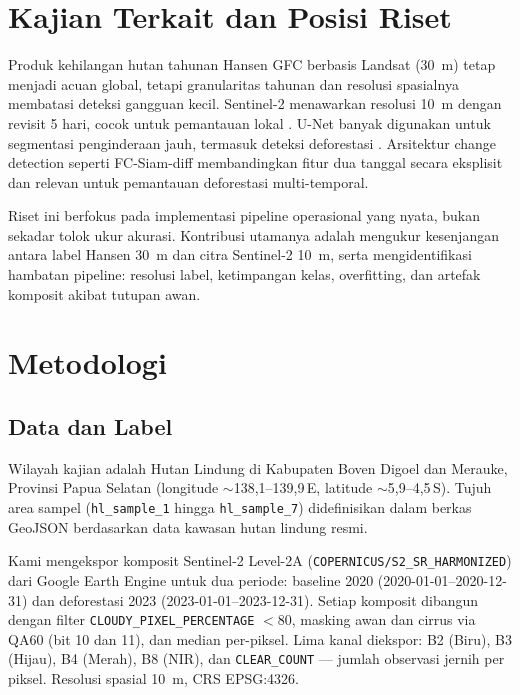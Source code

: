 \documentclass[10pt,a4paper,onecolumn]{article}
\begin{document}
\section{Kajian Terkait dan Posisi Riset}
Produk kehilangan hutan tahunan Hansen GFC \cite{hansen2013high} berbasis
Landsat (30~m) tetap menjadi acuan global, tetapi granularitas tahunan
dan resolusi spasialnya membatasi deteksi gangguan kecil. Sentinel-2
menawarkan resolusi 10~m dengan revisit 5 hari, cocok untuk pemantauan
lokal \cite{drusch2012sentinel2}. U-Net \cite{ronneberger2015unet}
banyak digunakan untuk segmentasi penginderaan jauh, termasuk deteksi
deforestasi \cite{wagner2019change,john2022attention}. Arsitektur
change detection seperti FC-Siam-diff \cite{daudt2018fcsiam}
membandingkan fitur dua tanggal secara eksplisit dan relevan untuk
pemantauan deforestasi multi-temporal.

Riset ini berfokus pada implementasi pipeline operasional yang nyata,
bukan sekadar tolok ukur akurasi. Kontribusi utamanya adalah mengukur
kesenjangan antara label Hansen 30~m dan citra Sentinel-2 10~m, serta
mengidentifikasi hambatan pipeline: resolusi label, ketimpangan kelas,
overfitting, dan artefak komposit akibat tutupan awan.

\section{Metodologi}
\subsection{Data dan Label}
Wilayah kajian adalah Hutan Lindung di Kabupaten Boven Digoel dan
Merauke, Provinsi Papua Selatan (longitude $\sim$138,1--139,9\,E,
latitude $\sim$5,9--4,5\,S). Tujuh area sampel (\texttt{hl\_sample\_1}
hingga \texttt{hl\_sample\_7}) didefinisikan dalam berkas GeoJSON
berdasarkan data kawasan hutan lindung resmi.

Kami mengekspor komposit Sentinel-2 Level-2A
(\texttt{COPERNICUS/S2\_SR\_HARMONIZED}) dari Google Earth Engine
\cite{gorelick2017gee} untuk dua periode: baseline 2020
(2020-01-01--2020-12-31) dan deforestasi 2023 (2023-01-01--2023-12-31).
Setiap komposit dibangun dengan filter \texttt{CLOUDY\_PIXEL\_PERCENTAGE}
$<80$, masking awan dan cirrus via QA60 (bit 10 dan 11), dan median
per-piksel. Lima kanal diekspor: B2 (Biru), B3 (Hijau), B4 (Merah), B8
(NIR), dan \texttt{CLEAR\_COUNT} --- jumlah observasi jernih per piksel.
Resolusi spasial 10~m, CRS EPSG:4326.
\end{document}
